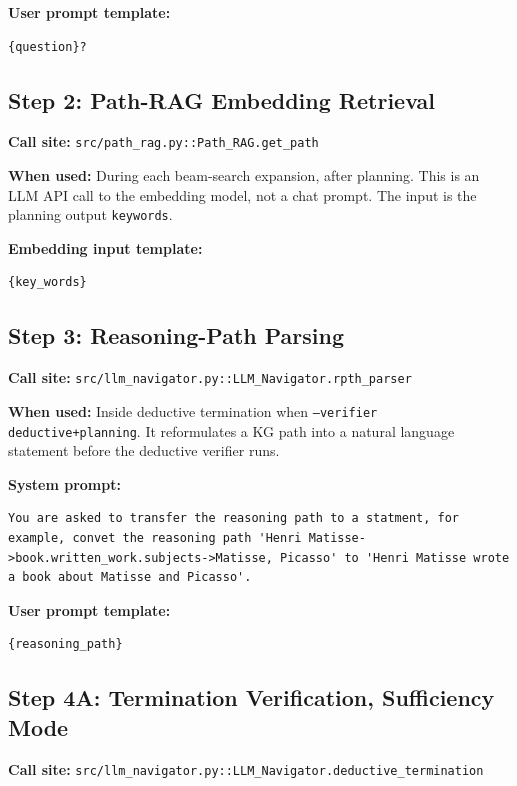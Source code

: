\documentclass[11pt]{article}
\begin{document}
\textbf{User prompt template:}
\begin{lstlisting}[style=prompt]
{question}?
\end{lstlisting}

\subsection{Step 2: Path-RAG Embedding Retrieval}

\textbf{Call site:} \texttt{src/path\_rag.py::Path\_RAG.get\_path}

\textbf{When used:} During each beam-search expansion, after planning. This is
an LLM API call to the embedding model, not a chat prompt. The input is the
planning output \texttt{keywords}.

\textbf{Embedding input template:}
\begin{lstlisting}[style=prompt]
{key_words}
\end{lstlisting}

\subsection{Step 3: Reasoning-Path Parsing}

\textbf{Call site:} \texttt{src/llm\_navigator.py::LLM\_Navigator.rpth\_parser}

\textbf{When used:} Inside deductive termination when
\texttt{--verifier deductive+planning}. It reformulates a KG path into a natural
language statement before the deductive verifier runs.

\textbf{System prompt:}
\begin{lstlisting}[style=prompt]
You are asked to transfer the reasoning path to a statment, for example, convet the reasoning path 'Henri Matisse->book.written_work.subjects->Matisse, Picasso' to 'Henri Matisse wrote a book about Matisse and Picasso'.
\end{lstlisting}

\textbf{User prompt template:}
\begin{lstlisting}[style=prompt]
{reasoning_path}
\end{lstlisting}

\subsection{Step 4A: Termination Verification, Sufficiency Mode}

\textbf{Call site:} \texttt{src/llm\_navigator.py::LLM\_Navigator.deductive\_termination}
\end{document}
